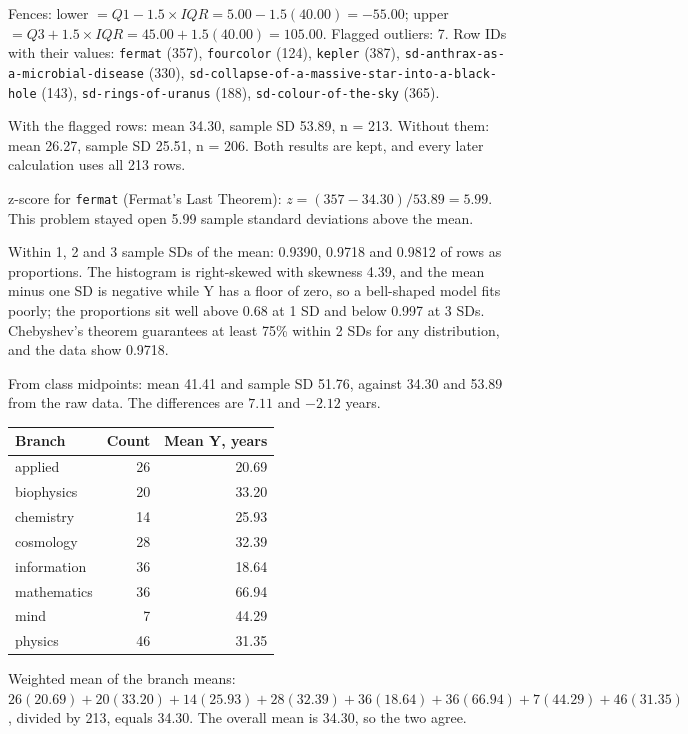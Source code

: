 \documentclass[11pt]{article}
\begin{document}
Fences: lower $= Q1 - 1.5 \times IQR = 5.00 - 1.5(40.00) = -55.00$; upper $= Q3 + 1.5 \times IQR = 45.00 + 1.5(40.00) = 105.00$. Flagged outliers: 7. Row IDs with their values: \texttt{fermat} (357), \texttt{fourcolor} (124), \texttt{kepler} (387), \texttt{sd-anthrax-as-a-microbial-disease} (330), \texttt{sd-collapse-of-a-massive-star-into-a-black-hole} (143), \texttt{sd-rings-of-uranus} (188), \texttt{sd-colour-of-the-sky} (365).

With the flagged rows: mean 34.30, sample SD 53.89, n = 213. Without them: mean 26.27, sample SD 25.51, n = 206. Both results are kept, and every later calculation uses all 213 rows.

z-score for \texttt{fermat} (Fermat's Last Theorem): $z = (357 - 34.30) / 53.89 = 5.99$. This problem stayed open 5.99 sample standard deviations above the mean.

Within 1, 2 and 3 sample SDs of the mean: 0.9390, 0.9718 and 0.9812 of rows as proportions. The histogram is right-skewed with skewness 4.39, and the mean minus one SD is negative while Y has a floor of zero, so a bell-shaped model fits poorly; the proportions sit well above 0.68 at 1 SD and below 0.997 at 3 SDs. Chebyshev's theorem guarantees at least 75\% within 2 SDs for any distribution, and the data show 0.9718.

From class midpoints: mean 41.41 and sample SD 51.76, against 34.30 and 53.89 from the raw data. The differences are $7.11$ and $-2.12$ years.

\begin{center}\begin{tabular}{lrr}
\toprule
Branch & Count & Mean Y, years \\
\midrule
applied & 26 & 20.69 \\
biophysics & 20 & 33.20 \\
chemistry & 14 & 25.93 \\
cosmology & 28 & 32.39 \\
information & 36 & 18.64 \\
mathematics & 36 & 66.94 \\
mind & 7 & 44.29 \\
physics & 46 & 31.35 \\
\bottomrule
\end{tabular}\end{center}

Weighted mean of the branch means: $26(20.69) + 20(33.20) + 14(25.93) + 28(32.39) + 36(18.64) + 36(66.94) + 7(44.29) + 46(31.35)$, divided by 213, equals 34.30. The overall mean is 34.30, so the two agree.
\end{document}
